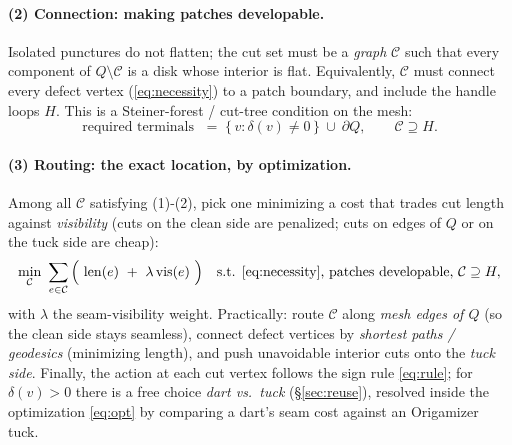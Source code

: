\documentclass[11pt]{article}
\newcommand{\defect}{\delta}
\newcommand{\cut}{\mathcal{C}}
\begin{document}
\paragraph{(2) Connection: making patches developable.}
Isolated punctures do not flatten; the cut set must be a \emph{graph}
$\cut$ such that every component of $Q\setminus\cut$ is a disk whose
interior is flat. Equivalently, $\cut$ must connect every defect vertex
(\ref{eq:necessity}) to a patch boundary, and include the handle loops
$H$. This is a Steiner-forest / cut-tree condition on the mesh:
\begin{equation}
\text{required terminals } \;=\; \{\,v : \defect(v)\neq 0\,\}\ \cup\ \partial Q,
\qquad \cut \supseteq H.
\end{equation}

\paragraph{(3) Routing: the exact location, by optimization.}
Among all $\cut$ satisfying (1)-(2), pick one minimizing a cost that
trades cut length against \emph{visibility} (cuts on the clean side are
penalized; cuts on edges of $Q$ or on the tuck side are cheap):
\begin{equation}
\min_{\cut}\ \sum_{e\in\cut}\Big(\ \mathrm{len}(e)\ +\ \lambda\,\mathrm{vis}(e)\ \Big)
\quad\text{s.t. \eqref{eq:necessity}, patches developable, } \cut\supseteq H,
\label{eq:opt}
\end{equation}
with $\lambda$ the seam-visibility weight. Practically: route $\cut$ along
\emph{mesh edges of $Q$} (so the clean side stays seamless), connect defect
vertices by \emph{shortest paths / geodesics} (minimizing length), and push
unavoidable interior cuts onto the \emph{tuck side}. Finally, the action at
each cut vertex follows the sign rule \eqref{eq:rule}; for $\defect(v)>0$
there is a free choice \emph{dart vs.\ tuck} (\S\ref{sec:reuse}), resolved
inside the optimization \eqref{eq:opt} by comparing a dart's seam cost
against an Origamizer tuck.
\end{document}
